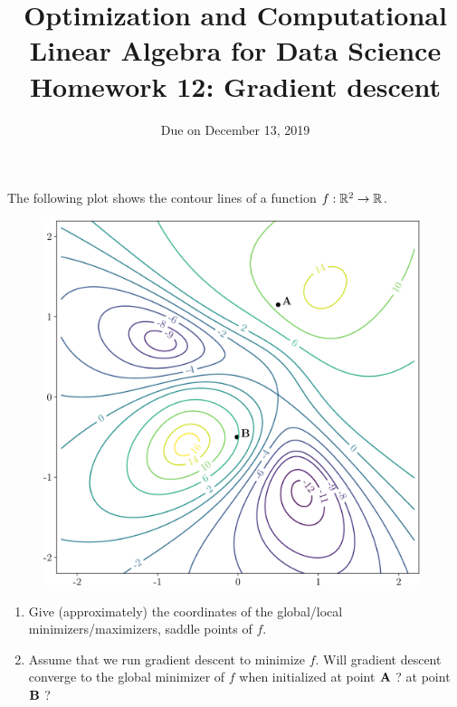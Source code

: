 \documentclass[11pt,nocut]{article}
\title{\vspace{-2.0cm}%
	Optimization and Computational Linear Algebra for Data Science\\
Homework 12: Gradient descent}
\date{}
\author{Due on December 13, 2019}
\begin{document}
\maketitle


\vspace{1mm}

\begin{problem}[2 points] The following plot shows the contour lines of a function $f:\mathbb{R}^2 \to \mathbb{R}$.
	\begin{figure}[H]
		\begin{center}
		\includegraphics[width=11cm]{contours.pdf}
		\end{center}
	\end{figure}
	\begin{enumerate}[label=\normalfont(\textbf{\alph*})]
		\item Give (approximately) the coordinates of the global/local minimizers/maximizers, saddle points of $f$.
		\item Assume that we run gradient descent to minimize $f$. Will gradient descent converge to the global minimizer of $f$ when initialized at point $\mathbf{A}$ ? at point $\mathbf{B}$ ?
	\end{enumerate}
\end{problem}

\vspace{5mm}
\end{document}
